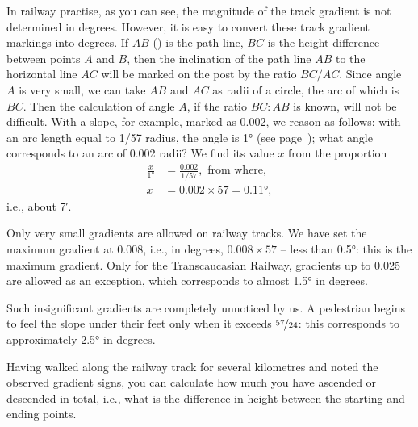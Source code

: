 In railway practise, as you can see, the magnitude of the track gradient is not determined in degrees. However, it is easy to convert these track gradient markings into degrees. If $AB$ () is the path line, $BC$ is the height difference between points $A$ and $B$, then the inclination of the path line $AB$ to the horizontal line $AC$ will be marked on the post by the ratio $BC/AC$. Since angle $A$ is very small, we can take $AB$ and $AC$ as radii of a circle, the arc of which is $BC$. Then the calculation of angle $A$, if the ratio $BC:AB$ is known, will not be difficult. With a slope, for example, marked as 0.002, we reason as follows: with an arc length equal to 1/57 radius, the angle is \ang{1} (see page~\pageref{fig-062}); what angle corresponds to an arc of 0.002 radii? We find its value $x$ from the proportion 
\begin{align*}%
\frac{x}{\ang{1}} & = \frac{0.002}{1/57},\,\, \text{from where,}\\
x & = 0.002 \times 57 = \ang{0.11},
\end{align*}
i.e., about \ang{;7}.
 
Only very small gradients are allowed on railway tracks. We have set the maximum gradient at 0.008, i.e., in degrees, $0.008 \times 57$ -- less than \ang{0.5}: this is the maximum gradient. Only for the Transcaucasian Railway, gradients up to 0.025 are allowed as an exception, which corresponds to almost \ang{1.5} in degrees.

Such insignificant gradients are completely unnoticed by us. A pedestrian begins to feel the slope under their feet only when it exceeds $\nicefrac{57}{24}$: this corresponds to approximately \ang{2.5} in degrees.

Having walked along the railway track for several kilometres and noted the observed gradient signs, you can calculate how much you have ascended or descended in total, i.e., what is the difference in height between the starting and ending points.


